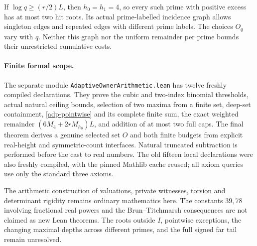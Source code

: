 If \(\log q\geq(r/2)L\), then \(h_0=h_1=4\), so every such prime
with positive excess has at most two hit roots. Its actual
prime-labelled incidence graph allows singleton edges and repeated
edges with different prime labels. The choices \(O_q\) vary with
\(q\). Neither this graph nor the uniform remainder per prime
bounds their unrestricted cumulative costs.

\paragraph{Finite formal scope.}
The separate module
\texttt{Adaptive\allowbreak Owner\allowbreak Arithmetic.lean}
has twelve freshly compiled declarations. They prove the cubic and
two-index binomial thresholds, actual natural ceiling bounds,
selection of two maxima from a finite set, deep-set containment,
\eqref{adp-pointwise} and its complete finite sum, the exact weighted
remainder \((6M_4+2rM_{h_0})L\), and addition of at most two full caps.
The final theorem derives a genuine selected set \(O\) and both
finite budgets from explicit real-height and symmetric-count
interfaces. Natural truncated subtraction is performed before the
cast to real numbers. The old fifteen local declarations were also
freshly compiled, with the pinned Mathlib cache reused; all axiom
queries use only the standard three axioms.

The arithmetic construction of valuations, private witnesses,
torsion and determinant rigidity remains ordinary mathematics here.
The constants \(39,78\) involving fractional real powers and the
Brun--Titchmarsh consequences are not claimed as new Lean theorems.
The roots outside \(I\), pointwise exceptions, the changing maximal
depths across different primes, and the full signed far tail remain
unresolved.
